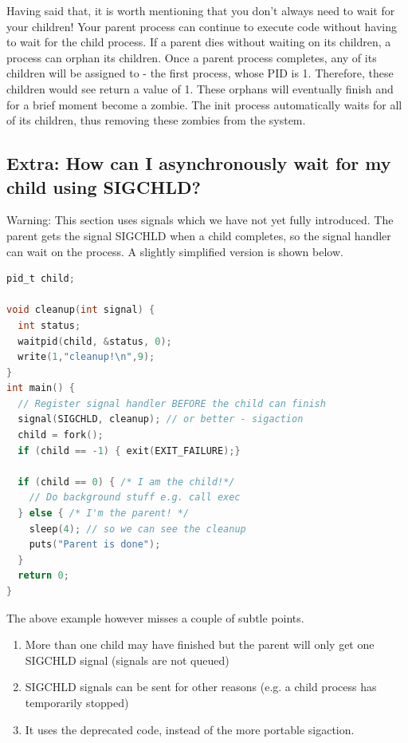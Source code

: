 Having said that, it is worth mentioning that you don't always need to wait for your children!
Your parent process can continue to execute code without having to wait for the child process.
If a parent dies without waiting on its children, a process can orphan its children.
Once a parent process completes, any of its children will be assigned to  - the first process, whose PID is 1.
Therefore, these children would see  return a value of 1.
These orphans will eventually finish and for a brief moment become a zombie.
The init process automatically waits for all of its children, thus removing these zombies from the system.

\subsection{Extra: How can I asynchronously wait for my child using SIGCHLD?}

Warning: This section uses signals which we have not yet fully introduced.
The parent gets the signal SIGCHLD when a child completes, so the signal handler can wait on the process.
A slightly simplified version is shown below.

\begin{lstlisting}[language=C]
pid_t child;

void cleanup(int signal) {
  int status;
  waitpid(child, &status, 0);
  write(1,"cleanup!\n",9);
}
int main() {
  // Register signal handler BEFORE the child can finish
  signal(SIGCHLD, cleanup); // or better - sigaction
  child = fork();
  if (child == -1) { exit(EXIT_FAILURE);}

  if (child == 0) { /* I am the child!*/
    // Do background stuff e.g. call exec
  } else { /* I'm the parent! */
    sleep(4); // so we can see the cleanup
    puts("Parent is done");
  }
  return 0;
}
\end{lstlisting}

The above example however misses a couple of subtle points.
\begin{enumerate}
    \item More than one child may have finished but the parent will only get one SIGCHLD signal (signals are not queued)
    \item SIGCHLD signals can be sent for other reasons (e.g. a child process has temporarily stopped)
    \item It uses the deprecated  code, instead of the more portable sigaction.
\end{enumerate}

